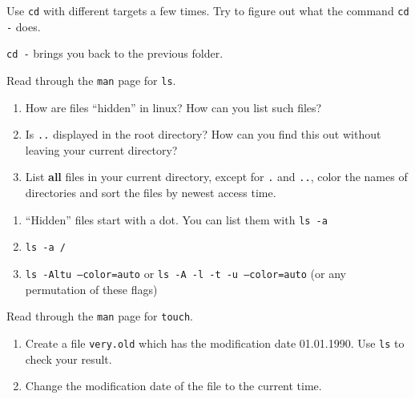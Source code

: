 \documentclass[english]{sheet}
\begin{document}
\begin{exercise}[subtitle=Navigation]
    Use \texttt{cd} with different targets a few times. Try to figure out what the command \texttt{cd -} does.
\end{exercise}

\begin{solution}
    \texttt{cd -} brings you back to the previous folder.
\end{solution}

\begin{exercise}[subtitle=Listing Directories and Hidden Files with \texttt{ls}]
    Read through the \texttt{man} page for \texttt{ls}.
    \begin{enumerate}
        \item How are files ``hidden'' in linux? How can you list such files?
        \item Is \texttt{..} displayed in the root directory? How can you find this out without leaving your current directory?
        \item List \textbf{all} files in your current directory, except for \texttt{.} and \texttt{..}, color the names of directories and sort the files by newest access time.
    \end{enumerate}
\end{exercise}

\begin{solution}
    \begin{enumerate}
        \item ``Hidden'' files start with a dot. You can list them with \texttt{ls -a}
        \item \texttt{ls -a /}
        \item \texttt{ls -Altu --color=auto} or \texttt{ls -A -l -t -u --color=auto} (or any permutation of these flags)
    \end{enumerate}
\end{solution}

\begin{exercise}[subtitle=(*) Timestamps with \texttt{touch}]
    Read through the \texttt{man} page for \texttt{touch}.
    \begin{enumerate}
        \item Create a file \texttt{very.old} which has the modification date 01.01.1990. Use \texttt{ls} to check your result.
        \item Change the modification date of the file to the current time.
    \end{enumerate}
\end{exercise}
\end{document}
